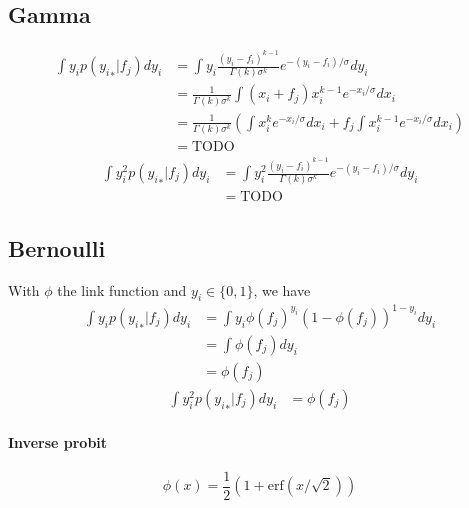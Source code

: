 \documentclass[5p,11pt]{article}
\begin{document}
\subsection{Gamma}
\begin{equation}
    \begin{aligned}
        \int y_i p({y_i}_*|f_j)dy_i &= \int y_i \frac{(y_i-f_i)^{k-1}}{\Gamma(k)\sigma^k}e^{-(y_i-f_i)/\sigma} dy_i\\
        &= \frac{1}{\Gamma(k)\sigma^k} \int (x_i+f_j) x_i^{k-1}e^{-x_i/\sigma} dx_i\\
        &= \frac{1}{\Gamma(k)\sigma^k} \left( \int x_i^ke^{-x_i/\sigma} dx_i + f_j \int x_i^{k-1} e^{-x_i/\sigma} dx_i \right) \\
        &= \mathrm{TODO}
    \end{aligned}
\end{equation}
\begin{equation}
    \begin{aligned}
        \int y_i^2 p({y_i}_*|f_j)dy_i &= \int y_i^2 \frac{(y_i-f_i)^{k-1}}{\Gamma(k)\sigma^k}e^{-(y_i-f_i)/\sigma} dy_i\\
        &= \mathrm{TODO}
    \end{aligned}
\end{equation}

\subsection{Bernoulli}
With $\phi$ the link function and $y_i \in \{0,1\}$, we have
\begin{equation}
    \begin{aligned}
        \int y_i p({y_i}_*|f_j)dy_i &= \int y_i \phi(f_j)^{y_i} (1-\phi(f_j))^{1-y_i} dy_i\\
        &= \int \phi(f_j)dy_i \\
        &= \phi(f_j)
    \end{aligned}
\end{equation}
\begin{equation}
    \begin{aligned}
        \int y_i^2 p({y_i}_*|f_j)dy_i &= \phi(f_j)
    \end{aligned}
\end{equation}

\paragraph{Inverse probit}
$$ \phi(x) = \frac{1}{2}\left(1 + \mathrm{erf}(x / \sqrt{2})\right) $$
\end{document}
